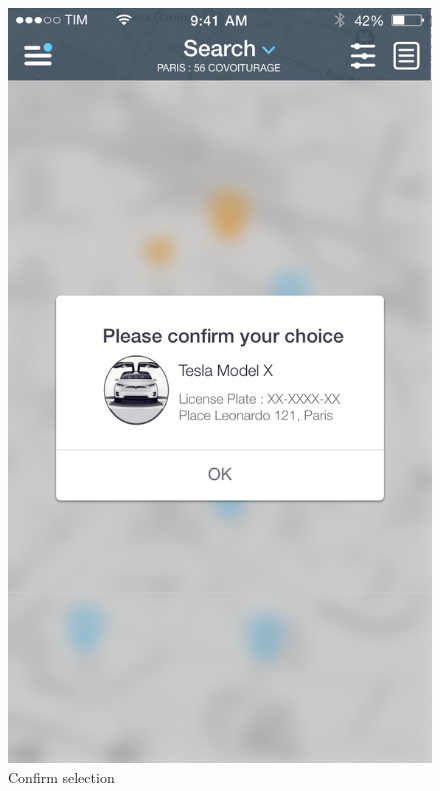 \documentclass[12pt]{article}
\begin{document}
 	 	\begin{figure}
		 \centering	
		 \includegraphics[scale=0.25]{Images/mobileApp/Conferma.png}
		 \caption{Confirm selection}
		 \endminipage
		 \centering

\end{figure}
\end{document}
